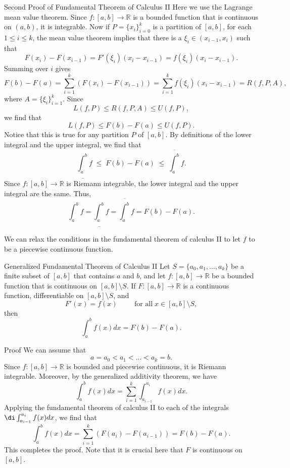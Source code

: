 \begin{example}[label=20230527]{}
\begin{myproof}{Second Proof of Fundamental Theorem of Calculus II}
Here we use the Lagrange mean value theorem. Since $f:[a,b]\to\mathbb{R}$ is a bounded function that is continuous on $(a,b)$, it is integrable. Now if $P=\{x_i\}_{i=0}^k$ is a partition of $[a,b]$, for each $1\leq i\leq k$, the mean value theorem implies that there is a $\xi_i\in (x_{i-1}, x_i)$ such that
\[F(x_i)-F(x_{i-1})=F'(\xi_i)(x_i-x_{i-1})=f(\xi_i)(x_i-x_{i-1}).\]
Summing over $i$ gives
\[F(b)-F(a)=\sum_{i=1}^k\left(F(x_i)-F(x_{i-1})\right)=\sum_{i=1}^k f(\xi_i)(x_i-x_{i-1})=R(f,P,A),\]where $A=\{\xi_i\}_{i=1}^k$. Since
\[L(f,P)\leq R(f,P,A)\leq U(f,P),\]we find that
\[L(f,P)\leq F(b)-F(a)\leq U(f,P).\]
Notice that this is true for any partition $P$ of $[a,b]$. By definitions of the lower integral and the upper integral, we find that
\[\underline{\int_a^b}f\;\leq\;F(b)-F(a)\;\leq\;\overline{\int_a^b}f.\]
Since $f:[a,b]\to\mathbb{R}$ is Riemann integrable, the lower integral and the upper integral are the same. Thus,
\[\int_a^b f=\underline{\int_a^b}f=\overline{\int_a^b}f=F(b)-F(a).\]
 

\end{myproof}


We can relax the conditions in the fundamental theorem of calculus II to let $f$ to be a piecewise continuous function.
\begin{corollary}{Generalized Fundamental Theorem of Calculus II}
 Let $S=\{a_0, a_1, \ldots, a_k\}$ be a finite subset of $[a,b]$ that contains $a$ and $b$, and let $f:[a,b]\to\mathbb{R}$ be a bounded function that is continuous on $[a,b]\setminus S$. If $F:[a,b]\to\mathbb{R}$ is a continuous function, differentiable on $[a,b]\setminus S$, and
\[F'(x)=f(x)\hspace{1cm}\text{for all}\;x\in [a,b]\setminus S,\] then
\[\int_a^b f(x)dx=F(b)-F(a).\]
\end{corollary}
\begin{myproof}{Proof}
We can assume that
\[a=a_0<a_1<\ldots<a_k=b.\]
Since $f:[a,b]\to\mathbb{R}$ is bounded and piecewise continuous, it is Riemann integrable. Moreover, by the generalized additivity theorem, we have
\[\int_a^bf(x)dx=\sum_{i=1}^k\int_{a_{i-1}}^{a_i}f(x)dx.\]
Applying the fundamental theorem of calculus II to each of the integrals $\di \int_{a_{i-1}}^{a_i}f(x)dx$, we find that
\[\int_a^b f(x)dx=\sum_{i=1}^k (F(a_i)-F(a_{i-1}))=F(b)-F(a).\]This completes the proof.
Note that it is crucial here that $F$ is continuous on $[a,b]$.
\end{myproof}


\end{example}

